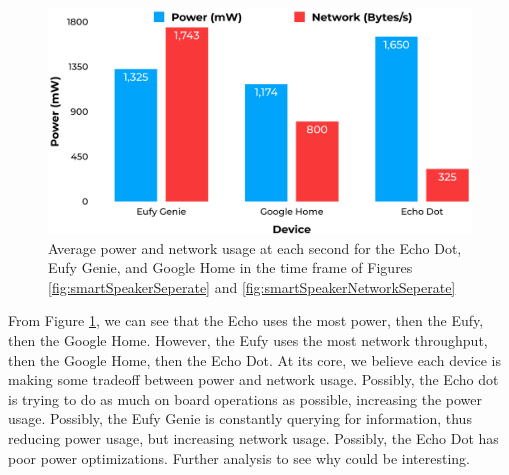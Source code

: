 \begin{figure}[H]
    \centering
    \includegraphics[width=1\textwidth]{figures/smartSpeakerComparison.png}
    \caption{Average power and network usage at each second for the Echo Dot, Eufy Genie, and Google Home in the time frame of Figures \ref{fig:smartSpeakerSeperate} and \ref{fig:smartSpeakerNetworkSeperate}}
    \label{fig:smartSpeakerComparison}
  \end{figure}


From Figure \ref{fig:smartSpeakerComparison}, we can see that the Echo uses the most power, then the Eufy, then the Google Home. However, the Eufy uses the most network throughput, then the Google Home, then the Echo Dot. At its core, we believe each device is making some tradeoff between power and network usage. Possibly, the Echo dot is trying to do as much on board operations as possible, increasing the power usage. Possibly, the Eufy Genie is constantly querying for information, thus reducing power usage, but increasing network usage. Possibly, the Echo Dot has poor power optimizations. Further analysis to see why could be interesting.

